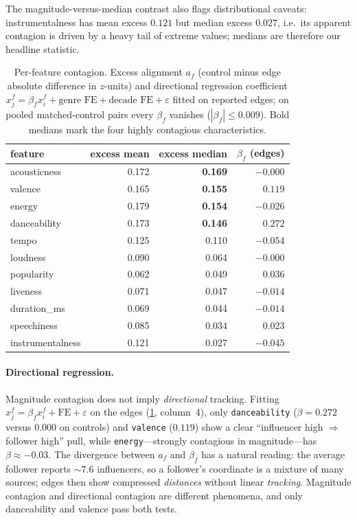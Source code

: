 The magnitude-versus-median contrast also flags distributional caveats:
instrumentalness has mean excess $0.121$ but median excess $0.027$,
i.e.\ its apparent contagion is driven by a heavy tail of extreme
values; medians are therefore our headline statistic.

\begin{table}[htbp]
\centering\small
\begin{tabular}{lrrr}
\toprule
feature & excess mean & excess median & $\beta_f$ (edges) \\
\midrule
acousticness    & 0.172 & \textbf{0.169} & $-0.000$ \\
valence         & 0.165 & \textbf{0.155} & $0.119$  \\
energy          & 0.179 & \textbf{0.154} & $-0.026$ \\
danceability    & 0.173 & \textbf{0.146} & $0.272$  \\
tempo           & 0.125 & 0.110          & $-0.054$ \\
loudness        & 0.090 & 0.064          & $-0.000$ \\
popularity      & 0.062 & 0.049          & $0.036$  \\
liveness        & 0.071 & 0.047          & $-0.014$ \\
duration\_ms    & 0.069 & 0.044          & $-0.014$ \\
speechiness     & 0.085 & 0.034          & $0.023$  \\
instrumentalness& 0.121 & 0.027          & $-0.045$ \\
\bottomrule
\end{tabular}
\caption{Per-feature contagion. Excess alignment
$a_f$ (control minus edge absolute difference in $z$-units) and
directional regression coefficient
$x_j^{f}=\beta_f x_i^{f}+\text{genre FE}+\text{decade FE}+\varepsilon$
fitted on reported edges; on pooled matched-control pairs every
$\beta_f$ vanishes ($|\beta_f|\le 0.009$). Bold medians mark the four
highly contagious characteristics.}
\label{tab:q4-features}
\end{table}

\paragraph{Directional regression.}
Magnitude contagion does not imply \emph{directional} tracking. Fitting
$x_j^{f}=\beta_f x_i^{f}+\text{FE}+\varepsilon$ on the edges
(\cref{tab:q4-features}, column~4), only \texttt{danceability}
($\beta=0.272$ versus $0.000$ on controls) and \texttt{valence}
($0.119$) show a clear ``influencer high $\Rightarrow$ follower high''
pull, while \texttt{energy}---strongly contagious in magnitude---has
$\beta\approx-0.03$. The divergence between $a_f$ and $\beta_f$ has a
natural reading: the average follower reports ${\sim}7.6$ influencers,
so a follower's coordinate is a mixture of many sources; edges then show
compressed \emph{distances} without linear \emph{tracking}. Magnitude
contagion and directional contagion are different phenomena, and only
danceability and valence pass both tests.

